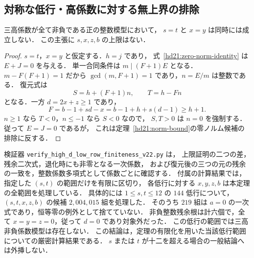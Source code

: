\subsection{対称な低行・高係数に対する無上界の排除}

\begin{proposition}
\label{hd22:symmetric-sector}
三高係数が全て非負である正の整数模型において，
$s=t$ と $x=y$ は同時には成立しない．
この主張に $s,x,z,b$ の上限はない．
\end{proposition}

\begin{proof}
$s=t$，$x=y$ と仮定する．$h=j$ であり，
式~\eqref{hd21:zero-norm-identity} は $E+J=0$ を与える．
単一合同条件は $m\mid(F+1)E$ となる．
$m-F(F+1)=1$ だから $\gcd(m,F+1)=1$ であり，$n=E/m$ は整数である．
復元式は
\[
 S=h+(F+1)n,\qquad T=h-Fn
\]
となる．一方 $d=2x+z\ge1$ であり，
\[
 F=b-1+sd-x=b-1+h+s(d-1)\ge h+1.
\]
$n\ge1$ なら $T<0$，$n\le-1$ なら $S<0$ なので，
$S,T>0$ は $n=0$ を強制する．従って $E=J=0$ であるが，
これは定理~\ref{hd21:norm-bound}の零ノルム候補の排除に反する．
\end{proof}

検証器 \nolinkurl{verify_high_d_low_row_finiteness_v22.py} は，
上限証明の二つの差，残余二次式，退化時にも非零となる一次係数，
および復元後の三つの元の残余の一致を，整数係数多項式として係数ごとに確認する．
付属の計算結果では，指定した $(s,t)$ の範囲だけを有限に区切り，
各低行に対する $x,y,z,b$ は本定理の全範囲を処理している．
具体的には $1\le s,t\le12$ の $144$ 低行について，
$(s,t,x,z,b)$ の候補 $2{,}004{,}015$ 組を処理した．
そのうち $219$ 組は $a=0$ の一次式であり，恒等零の例外として捨てていない．
非負整数残余根は計六個で，全て $x=y=z=0$，従って $d=0$ であり対象外だった．
この低行の範囲では三高非負係数模型は存在しない．
この結論は，定理の有限化を用いた当該低行範囲についての厳密計算結果である．
$s$ または $t$ が十二を超える場合の一般結論へは外挿しない．
